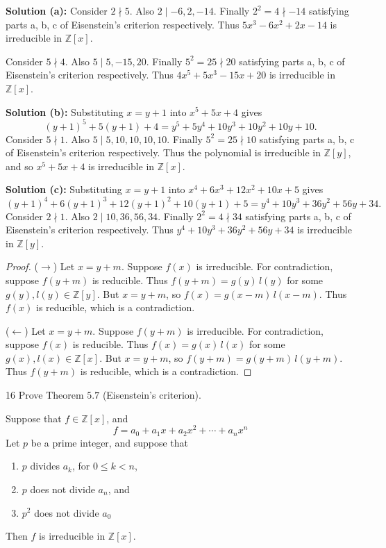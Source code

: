 \textbf{Solution (a):}
Consider $2 \nmid 5$. Also $2 \mid -6,  2, -14$.
Finally $2^2 = 4 \nmid -14$ satisfying parts a, b, c of 
Eisenstein's criterion respectively. Thus $5x^3 - 6x^2 + 2x - 14$
is irreducible in $\mathbb{Z}[x]$.

Consider $5 \nmid 4$. Also $5 \mid 5,  -15, 20$.
Finally $5^2 = 25 \nmid 20$ satisfying parts a, b, c of 
Eisenstein's criterion respectively. Thus $4x^5 + 5x^3 - 15x + 20$
is irreducible in $\mathbb{Z}[x]$.

\textbf{Solution (b):}
Substituting $x = y + 1$ into $x^5 + 5x + 4$ gives
\[
(y + 1)^5 + 5(y + 1) + 4 = y^5 + 5y^4 + 10y^3 + 10y^2 + 10y + 10.
\]
Consider $5 \nmid 1$. Also $5 \mid 5, 10, 10, 10, 10$. 
Finally $5^2 = 25 \nmid 10$ satisfying parts a, b, c of 
Eisenstein's criterion respectively. 
Thus the polynomial is irreducible in $\mathbb{Z}[y]$, 
    and so $x^5 + 5x + 4$ is irreducible in $\mathbb{Z}[x]$.

\textbf{Solution (c):}
Substituting $x = y + 1$ into $x^4 + 6x^3 + 12x^2 + 10x + 5$ gives
\[
(y + 1)^4 + 6(y + 1)^3 + 12(y + 1)^2 + 10(y + 1) + 5 = y^4 + 10y^3 + 36y^2 + 56y + 34.
\]
Consider $2 \nmid 1$. 
Also $2 \mid 10, 36, 56, 34$. 
Finally $2^2 = 4 \nmid 34$ satisfying parts a, b, c of Eisenstein's criterion respectively. 
Thus $y^4 + 10y^3 + 36y^2 + 56y + 34$ is irreducible in $\mathbb{Z}[y]$.

\begin{proof}
    ($\longrightarrow$) Let $x = y + m$.  
    Suppose $f(x)$ is irreducible.  
    For contradiction, suppose $f(y + m)$ is reducible.  
    Thus $f(y + m) = g(y) \, l(y)$ for some 
    $g(y), l(y) \in \mathbb{Z}[y]$.  
    But $x = y + m$, so $f(x) = g(x - m) \, l(x - m)$.  
    Thus $f(x)$ is reducible, which is a contradiction.

    ($\longleftarrow$) Let $x = y + m$.  
    Suppose $f(y + m)$ is irreducible.  
    For contradiction, suppose $f(x)$ is reducible.  
    Thus $f(x) = g(x) \, l(x)$ for some $g(x), l(x) \in \mathbb{Z}[x]$.  
    But $x = y + m$, so $f(y + m) = g(y + m) \, l(y + m)$.  
    Thus $f(y + m)$ is reducible, which is a contradiction.
\end{proof}

\begin{problem}{16}
    Prove Theorem $5.7$ (Eisenstein's criterion).
\end{problem}
\solved

\begin{theorem}
    Suppose that $f \in \mathbb{Z}[x]$,
        and 
    \[f = a_0 + a_1 x + a_2 x^2 + \cdots +  a_n x^n\]
    Let $p$ be a prime integer, and suppose that
    \begin{enumerate}
        \item $p$ divides $a_k$, for $0 \le k < n$,
        \item $p$ does not divide $a_n$, and 
        \item $p^2$ does not divide $a_0$
    \end{enumerate}
    Then $f$ is irreducible in $\mathbb{Z}[x]$.
\end{theorem}

